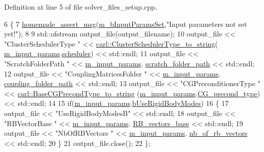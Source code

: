 Definition at line 5 of file solver\+\_\+files\+\_\+setup.\+cpp.


\begin{DoxyCode}
6 \{
7     \hyperlink{common__header_8h_a593ccc80b790b2268653fcf6597bf451}{homemade\_assert\_msg}(\hyperlink{classcarl_1_1_solver___files___setup_a7187af3c4a90be2d8ad2a25c11c0e910}{m\_bInputParamsSet},\textcolor{stringliteral}{"Input parameters not set
       yet!"});
8 
9     std::ofstream output\_file(output\_filename);
10     output\_file << \textcolor{stringliteral}{"ClusterSchedulerType "} << 
      \hyperlink{namespacecarl_a855a8c682ef0ee0a35f987e051d2bbf2}{carl::ClusterSchedulerType\_to\_string}(
      \hyperlink{classcarl_1_1_solver___files___setup_aa5804bf6c6e506b382766333f232d3d5}{m\_input\_params}.\hyperlink{structcarl_1_1feti__setup__init__params_ad1c1983a2374aa46f19ed79f8196f6d6}{scheduler}) << std::endl;
11     output\_file << \textcolor{stringliteral}{"ScratchFolderPath "} << \hyperlink{classcarl_1_1_solver___files___setup_aa5804bf6c6e506b382766333f232d3d5}{m\_input\_params}.
      \hyperlink{structcarl_1_1feti__setup__init__params_a57e553748427905076bae85d239f9537}{scratch\_folder\_path} << std::endl;
12     output\_file << \textcolor{stringliteral}{"CouplingMatricesFolder "} << \hyperlink{classcarl_1_1_solver___files___setup_aa5804bf6c6e506b382766333f232d3d5}{m\_input\_params}.
      \hyperlink{structcarl_1_1feti__setup__init__params_a5f710f34f0b3bdc9494c79c024fe2603}{coupling\_folder\_path} << std::endl;
13     output\_file << \textcolor{stringliteral}{"CGPreconditionerType "} << \hyperlink{namespacecarl_ae4298594b456c7d030d5be6868d6dc63}{carl::BaseCGPrecondType\_to\_string}
      (\hyperlink{classcarl_1_1_solver___files___setup_aa5804bf6c6e506b382766333f232d3d5}{m\_input\_params}.\hyperlink{structcarl_1_1feti__setup__init__params_a118e1fe1c87a75663fb50c4545524cb8}{CG\_precond\_type}) << std::endl;
14 
15     \textcolor{keywordflow}{if}(\hyperlink{classcarl_1_1_solver___files___setup_aa5804bf6c6e506b382766333f232d3d5}{m\_input\_params}.\hyperlink{structcarl_1_1feti__setup__init__params_af4191df4632d21bed2b302c08d113d14}{bUseRigidBodyModes})
16     \{
17         output\_file << \textcolor{stringliteral}{"UseRigidBodyModesB"} << std::endl;
18         output\_file << \textcolor{stringliteral}{"RBVectorBase "} << \hyperlink{classcarl_1_1_solver___files___setup_aa5804bf6c6e506b382766333f232d3d5}{m\_input\_params}.
      \hyperlink{structcarl_1_1feti__setup__init__params_aa70293e2d51c3475ebbdda0e338e8bbb}{RB\_vectors\_base} << std::endl;
19         output\_file << \textcolor{stringliteral}{"NbOfRBVectors "} << \hyperlink{classcarl_1_1_solver___files___setup_aa5804bf6c6e506b382766333f232d3d5}{m\_input\_params}.
      \hyperlink{structcarl_1_1feti__setup__init__params_a29d1a28ace280fb7fc2b7194fd9cea4a}{nb\_of\_rb\_vectors} << std::endl;
20     \}
21     output\_file.close();
22 \};
\end{DoxyCode}
